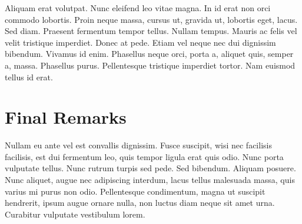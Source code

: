 \documentclass[conference, fleqn]{IEEEtran}
\begin{document}
Aliquam erat volutpat. Nunc eleifend leo vitae magna. In id erat non orci
commodo lobortis. Proin neque massa, cursus ut, gravida ut, lobortis eget,
lacus. Sed diam. Praesent fermentum tempor tellus. Nullam tempus. Mauris ac
felis vel velit tristique imperdiet. Donec at pede. Etiam vel neque nec dui
dignissim bibendum. Vivamus id enim. Phasellus neque orci, porta a, aliquet
quis, semper a, massa. Phasellus purus. Pellentesque tristique imperdiet tortor.
Nam euismod tellus id erat.
\section{Final Remarks}

Nullam eu ante vel est convallis dignissim. Fusce suscipit, wisi nec facilisis
facilisis, est dui fermentum leo, quis tempor ligula erat quis odio. Nunc porta
vulputate tellus. Nunc rutrum turpis sed pede. Sed bibendum. Aliquam posuere.
Nunc aliquet, augue nec adipiscing interdum, lacus tellus malesuada massa, quis
varius mi purus non odio. Pellentesque condimentum, magna ut suscipit hendrerit,
ipsum augue ornare nulla, non luctus diam neque sit amet urna. Curabitur
vulputate vestibulum lorem.



\end{document}
